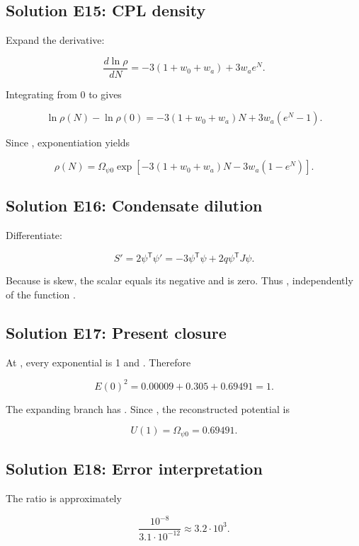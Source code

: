 \documentclass[11pt]{article}
\begin{document}
\subsection{Solution E15: CPL density}

Expand the derivative:

\[
\frac{d\ln\rho}{dN}
=-3(1+w_0+w_a)+3w_a e^N.
\]

Integrating from 0 to \texttt{} gives

\[
\ln\rho(N)-\ln\rho(0)
=-3(1+w_0+w_a)N+3w_a(e^N-1).
\]

Since \texttt{}, exponentiation yields

\[
\rho(N)=\Omega_{\psi0}
\exp[-3(1+w_0+w_a)N-3w_a(1-e^N)].
\]

\subsection{Solution E16: Condensate dilution}

Differentiate:

\[
S'=2\psi^{\mathsf T}\psi'
=-3\psi^{\mathsf T}\psi+2q\psi^{\mathsf T}J\psi.
\]

Because \texttt{} is skew, the scalar \texttt{} equals its negative and is zero. Thus \texttt{}, independently of the function \texttt{}.

\subsection{Solution E17: Present closure}

At \texttt{}, every exponential is 1 and \texttt{}. Therefore

\[
E(0)^2=0.00009+0.305+0.69491=1.
\]

The expanding branch has \texttt{}. Since \texttt{}, the reconstructed potential is

\[
U(1)=\Omega_{\psi0}=0.69491.
\]

\subsection{Solution E18: Error interpretation}

The ratio is approximately

\[
\frac{10^{-8}}{3.1\mathbin{\cdot}10^{-12}}
\mathrel{\approx}3.2\mathbin{\cdot}10^3.
\]
\end{document}
